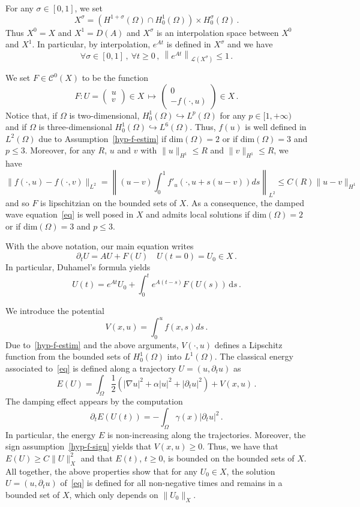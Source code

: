 \documentclass[AHL,Unicode,longabstracts]{cedram}
\newcommand{\Cc}{\mathcal{C}}
\newcommand{\Lc}{\mathcal{L}}
\newcommand{\drm}{\mathrm{d}}
\newcommand{\grad}{\nabla}
\newcommand{\vect}[2]{\left(
\begin{matrix} #1 \\ #2
\end{matrix}\right)}
\let\oldforall\forall
\renewcommand*{\forall}{\mathrel{\oldforall}}
\begin{document}
For any $\sigma\in [0,1]$, we set
\[
X^\sigma=\left(H^{1+\sigma}(\Omega)\cap H^1_0(\Omega)\right)\times
H^\sigma_0(\Omega)\,.
\]
Thus $X^0=X$ and $X^1=D(A)$ and $X^\sigma$ is an interpolation space between $X^0$ and $X^1$. In particular, by interpolation, $e^{At}$ is defined in $X^\sigma$ and we have
\begin{equation}\label{eq-bound-semigroup}
\forall \sigma\in [0,1]\,,\:\forall t\geq 0\,,\:
\left\|e^{At}\right\|_{\Lc(X^\sigma)}\leq 1\,.
\end{equation}

We set $F\in\Cc^0(X)$ to be the function
\begin{equation}\label{def-F}
F:U=\vect uv \in X\,\longmapsto\,\vect 0 {-f(\cdot,u)} \in X\,.
\end{equation}
Notice that, if $\Omega$ is two-dimensional, $H^1_0(\Omega) \hookrightarrow L^{p}(\Omega)$ for any $p\in[1,+\infty)$ and if $\Omega$ is three-dimensional $H^1_0(\Omega) \hookrightarrow L^6(\Omega)$. Thus, $f(u)$ is well defined in $L^2(\Omega)$ due to Assumption~\eqref{hyp-f-estim} if dim$(\Omega)=2$ or if dim$(\Omega)=3$ and $p\leq 3$. Moreover, for any $R$, $u$ and $v$ with $\|u\|_{H^1}\leq R$ and $\|v\|_{H^1}\leq R$, we have
\[
\|f(\cdot,u)-f(\cdot,v)\|_{L^2}=\left\|(u-v)\int_0^1
f'_u(\cdot,u+s(u-v))ds\right\|_{L^2}
\leq C(R)\|u-v\|_{H^1}
\]
and so $F$ is lipschitzian on the bounded sets of $X$. As a consequence, the damped wave equation~\eqref{eq} is well posed in $X$ and admits local solutions if dim$(\Omega)=2$ or if dim$(\Omega)=3$ and $p\leq 3$.

With the above notation, our main equation writes
\begin{equation}\label{eq2}
\partial_t U=AU + F(U)\quad U(t=0)=U_0\in X\,.
\end{equation}
In particular, Duhamel's formula yields
\[
U(t)=e^{At}U_0 + \int_0^t e^{A(t-s)}F(U(s))\,\drm s\,.
\]

We introduce the potential
\[
V(x,u)=\int_0^u f(x,s)ds\,.
\]
Due to~\eqref{hyp-f-estim} and the above arguments, $V(\cdot,u)$ defines a Lipschitz function from the bounded sets of $H^1_0(\Omega)$ into $L^1(\Omega)$. The classical energy associated to~\eqref{eq} is defined along a trajectory $U=(u,\partial_t u)$ as
\[
E(U)= \int_\Omega \frac12\left(|\grad u|^2+\alpha |u|^2+|\partial_t u|^2\right) +
V(x,u)\,.
\]
The damping effect appears by the computation
\begin{equation}\label{eq-deriv-E}
\partial_t E(U(t))= - \int_\Omega \gamma(x)|\partial_t u |^2\,.
\end{equation}
In particular, the energy $E$ is non-increasing along the trajectories. Moreover, the sign assumption~\eqref{hyp-f-sign} yields that $V(x,u)\geq 0$. Thus, we have that $E(U)\geq C \|U\|_X^2$ and that $E(t)$, $t\geq 0$, is bounded on the bounded sets of $X$. All together, the above properties show that for any $U_0\in X$, the solution $U=(u,\partial_t u)$ of~\eqref{eq} is defined for all non-negative times and remains in a bounded set of $X$, which only depends on $\|U_0\|_X$.
\end{document}
